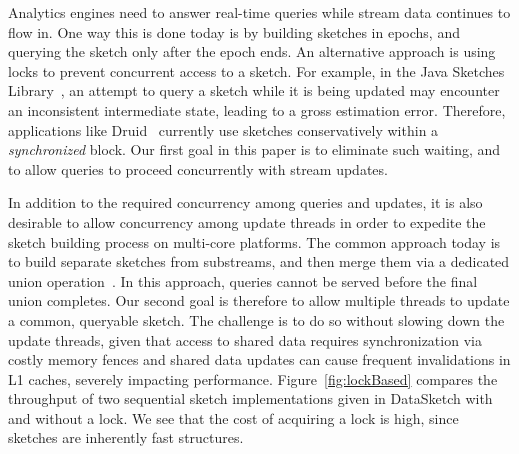  Analytics engines need to answer real-time queries while  stream data continues to flow in.
 One way this is done 
today is by building sketches in epochs, and querying the sketch only after
 the epoch ends. An alternative approach is using locks to prevent concurrent access to a sketch.
 For example, in the Java Sketches Library~\cite{sketchesLibrary},  an 
attempt to query a sketch  while it is being updated  may encounter an inconsistent
intermediate state, leading to a gross estimation error. Therefore, applications like Druid~\cite{druid}
currently use sketches conservatively within a \emph{synchronized} block.
Our first goal in this paper is to eliminate such waiting, and to allow queries to proceed 
concurrently with stream updates. 

In addition to the required concurrency among queries and updates,
it is also desirable to allow
concurrency among update threads in order to expedite the sketch building process on multi-core platforms. 
The common approach today is to build separate sketches from substreams, 
and then merge them via a dedicated union operation~\cite{multi-KMV}. 
In this approach, queries cannot be served before the final union completes. 
Our second goal is therefore to allow multiple threads to update a common, 
queryable sketch. The challenge is to do so without slowing down the update threads,
given that access to shared data requires  synchronization via costly memory fences 
and shared data updates can cause frequent invalidations in L1 caches, severely impacting performance. 
Figure~\ref{fig:lockBased} compares the throughput of two 
sequential sketch implementations given in DataSketch with
and without a lock. We see that 
the cost of acquiring a lock  is  high, since  sketches are
inherently fast structures.


